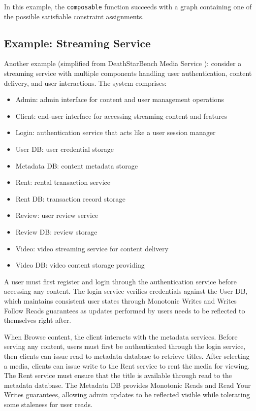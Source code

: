 In this example, the \texttt{composable} function succeeds with a
graph containing one
of the possible satisfiable constraint assignments.

\subsection{Example: Streaming Service}

Another example (simplified from DeathStarBench Media Service \cite{gan2019an}):
consider a streaming service with multiple components handling user
authentication, content delivery, and user interactions. The system comprises:

\begin{itemize}
  \item Admin: admin interface for content and user management operations
  \item Client: end-user interface for accessing streaming content and features
  \item Login: authentication service that acts like a user session manager
  \item User DB: user credential storage
  \item Metadata DB: content metadata storage
  \item Rent: rental transaction service
  \item Rent DB: transaction record storage
  \item Review: user review service
  \item Review DB: review storage
  \item Video: video streaming service for content delivery
  \item Video DB: video content storage providing
\end{itemize}

A user must first register and login through the authentication service before
accessing any content. The login service verifies credentials against the User
DB, which maintains consistent user states through Monotonic Writes and Writes
Follow Reads guarantees as updates performed by users needs to be reflected to
themselves right after.

When Browse content, the client interacts with the metadata services. Before
serving any content, users must first be authenticated through the login
service, then clients can issue read to metadata database to retrieve titles.
After selecting a media, clients can issue write to the Rent service to rent the
media for viewing. The Rent service must ensure that the title is available
through read to the metadata database. The Metadata DB provides Monotonic Reads
and Read Your Writes guarantees, allowing admin updates to be reflected visible
while tolerating some staleness for user reads.

